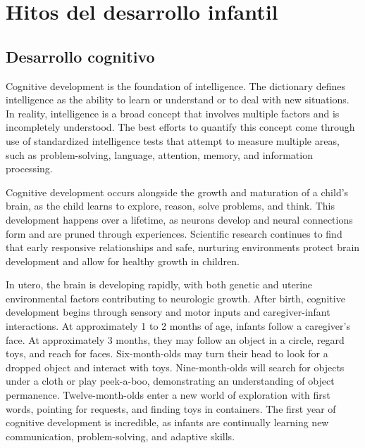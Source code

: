 \section{Hitos del desarrollo infantil}
\subsection{Desarrollo cognitivo}
Cognitive development is the foundation of intelligence. The dictionary defines
intelligence as the ability to learn or understand or to deal with new
situations. In reality, intelligence is a broad concept that involves multiple
factors and is incompletely understood. The best efforts to quantify this
concept come through use of standardized intelligence tests that attempt to
measure multiple areas, such as problem-solving, language, attention, memory,
and information processing. \cite{Willks2010}

Cognitive development occurs alongside the growth and maturation of a child’s
brain, as the child learns to explore, reason, solve problems, and think. This
development happens over a lifetime, as neurons develop and neural connections
form and are pruned through experiences. Scientific research continues to find
that early responsive relationships and safe, nurturing environments protect
brain development and allow for healthy growth in children. \cite{Crotty2023}

In utero, the brain is developing rapidly, with both genetic and uterine
environmental factors contributing to neurologic growth. After birth, cognitive
development begins through sensory and motor inputs and caregiver-infant
interactions. At approximately 1 to 2 months of age, infants follow a
caregiver’s face. At approximately 3 months, they may follow an object in a
circle, regard toys, and reach for faces. Six-month-olds may turn their head to
look for a dropped object and interact with toys. Nine-month-olds will search
for objects under a cloth or play peek-a-boo, demonstrating an understanding of
object permanence. Twelve-month-olds enter a new world of exploration with
first words, pointing for requests, and finding toys in containers. The first
year of cognitive development is incredible, as infants are continually
learning new communication, problem-solving, and adaptive skills.
\cite{Crotty2023}

